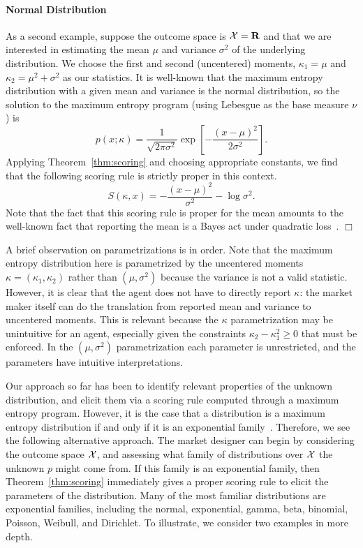 \paragraph{Normal Distribution}

As a second example, suppose the outcome space is $\mathcal{X} = \mathbf{R}$ and that we are interested in estimating the mean $\mu$ and variance $\sigma^2$ of the underlying distribution. We choose the first and second (uncentered) moments, $\kappa_1 = \mu$ and  $\kappa_2 = \mu^2 + \sigma^2$ as our statistics.  It is well-known that the maximum entropy distribution with a given mean and variance is the normal distribution, so the solution to the maximum entropy program (using Lebesgue as the base measure $\nu$) is
%
\[ p(x; \kappa) = \frac{1}{\sqrt{2\pi\sigma^2}} \exp\left[ -\frac{(x-\mu)^2}{2\sigma^2} \right]. \]
%
Applying Theorem~\ref{thm:scoring} and choosing appropriate constants, we find that the following scoring rule is strictly proper in this context. %
\[ S(\kappa, x) = -\frac{(x-\mu)^2}{\sigma^2} - \log \sigma^2. \]
%
Note that the fact that this scoring rule is proper for the mean amounts to the well-known fact that reporting the mean is a Bayes act under quadratic loss~\cite{someone}. \hfill{$\Box$} 

\medskip\noindent
A brief observation on parametrizations is in order. Note that the maximum entropy distribution here is parametrized by the uncentered moments $\kappa = (\kappa_1,\kappa_2)$ rather than $(\mu,\sigma^2)$ because the variance is not a valid statistic. However, it is clear that the agent does not have to directly report $\kappa$: the market maker itself can do the translation from reported mean and variance to uncentered moments. This is relevant because the $\kappa$ parametrization may be unintuitive for an agent, especially given the constraints $\kappa_2 - \kappa_1^2 \geq 0$ that must be enforced. In the $(\mu, \sigma^2)$ parametrization each parameter is unrestricted, and the parameters have intuitive interpretations.

Our approach so far has been to identify relevant properties of the unknown distribution, and elicit them via a scoring rule computed through a maximum entropy program. However, it is the case that a distribution is a maximum entropy distribution if and only if it is an exponential family~\cite{}. Therefore, we see the following alternative approach. The market designer can begin by considering the outcome space $\mathcal{X}$, and assessing what family of distributions over $\mathcal{X}$ the unknown $p$ might come from. If this family is an exponential family, then Theorem~\ref{thm:scoring} immediately gives a proper scoring rule to elicit the parameters of the distribution. Many of the most familiar distributions are exponential families, including the normal, exponential, gamma, beta, binomial, Poisson, Weibull, and Dirichlet. To illustrate, we consider two examples in more depth. 

